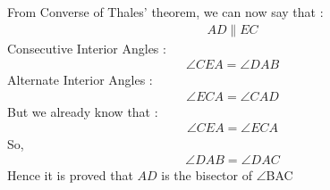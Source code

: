 \documentclass[journal,12pt,twocolumn]{IEEEtran}
\begin{document}
From Converse of Thales' theorem, we can now say that :
\begin{align}
 AD \parallel EC
\end{align}
Consecutive Interior Angles :
\begin{align}
  \angle CEA = \angle DAB  
\end{align}
Alternate Interior Angles :
\begin{align}
    \angle ECA = \angle CAD
\end{align}
But we already know that :
\begin{align}
    \angle CEA = \angle ECA
\end{align}
So,
\begin{align}
    \angle DAB = \angle DAC
\end{align}
Hence it is proved that $AD$ is the bisector of $\angle$BAC
\end{document}
